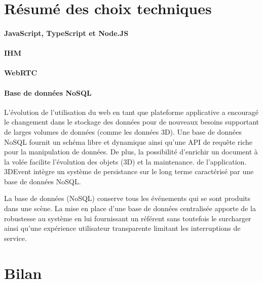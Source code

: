 


\section{Résumé des choix techniques}

\paragraph{JavaScript, TypeScript et Node.JS}
\paragraph{IHM}
\paragraph{WebRTC}
\paragraph{Base de données NoSQL}\label{p:nosql} L'évolution de 
l'utilisation du web en tant que plateforme applicative a encouragé le changement 
dans le stockage des données pour de nouveaux besoins supportant de larges 
volumes de données (comme les données 3D). Une base de données \gls{NoSQL} 
fournit un schéma libre et dynamique ainsi qu'une API de requête riche pour la 
manipulation de données. De plus, la possibilité d'enrichir un document \og à la volée\fg{} 
facilite l'évolution des objets (3D) et la maintenance. de l'application.
3DEvent intègre un système de persistance sur le long terme caractérisé par une 
base de données \gls{NoSQL}.

La base de données (\gls{NoSQL}) conserve tous les événements qui se
sont produits dans une scène. 
La mise en place d'une base de données centralisée apporte de la robustesse au 
système en lui fournissant un référent sans toutefois le surcharger ainsi qu'une 
expérience utilisateur transparente limitant les interruptions de service.
\section{Bilan}


